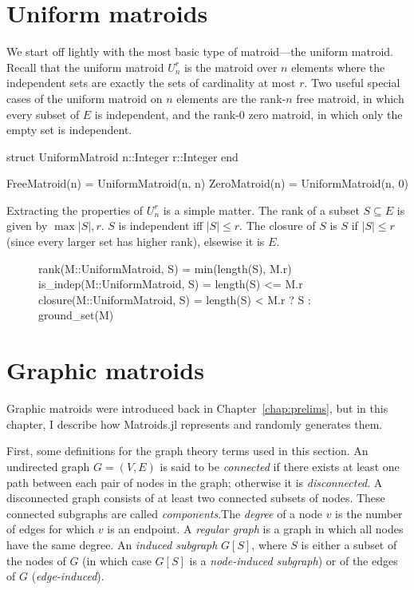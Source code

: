 \section{Uniform matroids}
We start off lightly with the most basic type of matroid---the uniform matroid. Recall that the uniform matroid $U_n^r$ is the matroid over $n$ elements where the independent sets are exactly the sets of cardinality at most $r$. Two useful special cases of the uniform matroid on $n$ elements are the rank-$n$ free matroid, in which every subset of $E$ is independent, and the rank-$0$ zero matroid, in which only the empty set is independent.

\begin{jllisting}
struct UniformMatroid
  n::Integer
  r::Integer
end

FreeMatroid(n) = UniformMatroid(n, n)
ZeroMatroid(n) = UniformMatroid(n, 0)
\end{jllisting}

Extracting the properties of $U_n^r$ is a simple matter. The rank of a subset $S\subseteq E$ is given by $\max{|S|, r}$. $S$ is independent iff $|S|\leq r$. The closure of $S$ is $S$ if $|S| \leq r$ (since every larger set has higher rank), elsewise it is $E$.
\begin{figure}[ht!]
\begin{jllisting}    
rank(M::UniformMatroid, S) = min(length(S), M.r)
is_indep(M::UniformMatroid, S) = length(S) <= M.r
closure(M::UniformMatroid, S) = length(S) < M.r ? S : ground_set(M)
\end{jllisting}
\end{figure}

\section{Graphic matroids}
Graphic matroids were introduced back in Chapter~\ref{chap:prelims}, but in this chapter, I describe how Matroids.jl represents and randomly generates them.

First, some definitions for the graph theory terms used in this section. An undirected graph $G=(V,E)$ is said to be \textit{connected} if there exists at least one path between each pair of nodes in the graph; otherwise it is \textit{disconnected}. A disconnected graph consists of at least two connected subsets of nodes. These connected subgraphs are called \textit{components}.The \textit{degree} of a node $v$ is the number of edges for which $v$ is an endpoint. A \textit{regular graph} is a graph in which all nodes have the same degree. An \textit{induced subgraph} $G[S]$, where $S$ is either a subset of the nodes of $G$ (in which case $G[S]$ is a \textit{node-induced subgraph}) or of the edges of $G$ (\textit{edge-induced}).

